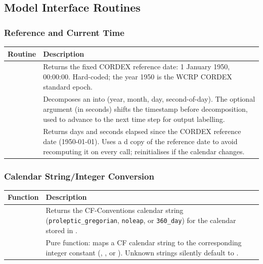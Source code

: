 \subsection{Model Interface Routines}
\label{subsec:date_model}

\subsubsection{Reference and Current Time}

\begin{longtable}{L{5.5cm} L{8.5cm}}
  \toprule
  \textbf{Routine} & \textbf{Description} \\
  \midrule
  \endhead
  \bottomrule
  \endfoot
   &
    Returns the fixed CORDEX reference date: 1 January 1950, 00:00:00.
    Hard-coded; the year 1950 is the WCRP CORDEX standard epoch. \\
   &
    Decomposes an  into (year, month, day,
    second-of-day). The optional  argument (in seconds) shifts
    the timestamp before decomposition, used to advance to the next time
    step for output labelling. \\
   &
    Returns days and seconds elapsed since the CORDEX reference date
    (1950-01-01). Uses a d copy of the reference date to avoid
    recomputing it on every call; reinitialises if the calendar changes. \\
\end{longtable}

\subsubsection{Calendar String/Integer Conversion}

\begin{longtable}{L{5cm} L{9cm}}
  \toprule
  \textbf{Function} & \textbf{Description} \\
  \midrule
  \endhead
  \bottomrule
  \endfoot
   &
    Returns the CF-Conventions calendar string
    (\texttt{proleptic\_gregorian}, \texttt{noleap}, or \texttt{360\_day})
    for the calendar stored in . \\
   &
    Pure function: maps a CF calendar string to the corresponding integer
    constant (, , or ).
    Unknown strings silently default to . \\
\end{longtable}

